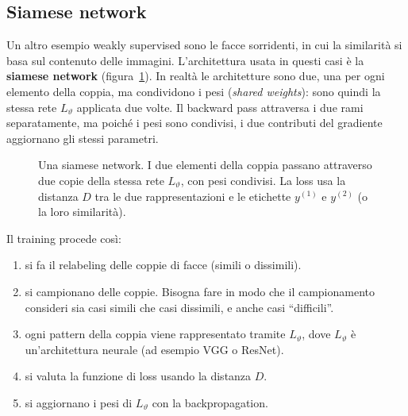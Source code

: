 \subsection{Siamese network}
Un altro esempio weakly supervised sono le facce sorridenti, in cui la similarità si basa sul contenuto delle immagini. L'architettura usata in questi casi è la \textbf{siamese network} (figura~\ref{fig:siamese}). In realtà le architetture sono due, una per ogni elemento della coppia, ma condividono i pesi (\emph{shared weights}): sono quindi la stessa rete $L_\vartheta$ applicata due volte. Il backward pass attraversa i due rami separatamente, ma poiché i pesi sono condivisi, i due contributi del gradiente aggiornano gli stessi parametri.

\begin{figure}[htbp]
\centering
{}
\caption{Una siamese network. I due elementi della coppia passano attraverso due copie della stessa rete $L_\vartheta$, con pesi condivisi. La loss usa la distanza $D$ tra le due rappresentazioni e le etichette $y^{(1)}$ e $y^{(2)}$ (o la loro similarità).}
\label{fig:siamese}
\end{figure}

Il training procede così:
\begin{enumerate}[start=0]
    \item si fa il relabeling delle coppie di facce (simili o dissimili).
    \item si campionano delle coppie. Bisogna fare in modo che il campionamento consideri sia casi simili che casi dissimili, e anche casi ``difficili''.
    \item ogni pattern della coppia viene rappresentato tramite $L_\vartheta$, dove $L_\vartheta$ è un'architettura neurale (ad esempio VGG o ResNet).
    \item si valuta la funzione di loss usando la distanza $D$.
    \item si aggiornano i pesi di $L_\vartheta$ con la backpropagation.
\end{enumerate}

